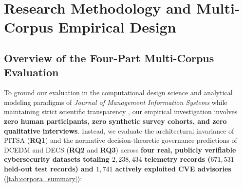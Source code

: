 \documentclass[11pt,a4paper]{article}
\begin{document}
\section{Research Methodology and Multi-Corpus Empirical Design}
\label{sec:methodology}

\subsection{Overview of the Four-Part Multi-Corpus Evaluation}
\label{subsec:method_overview}

To ground our evaluation in the computational design science and analytical modeling paradigms of \textit{Journal of Management Information Systems} \citep{ebrahimi2020semi, liu2020centralized, li2022assessing, ampel2024improving, tutun2024explainable} while maintaining strict scientific transparency \citep{diaz2023indigenous, davison2025research}, our empirical investigation involves \textbf{zero human participants, zero synthetic survey cohorts, and zero qualitative interviews}. Instead, we evaluate the architectural invariance of PITSA (\textbf{RQ1}) and the normative decision-theoretic governance predictions of DCEDM and DECS (\textbf{RQ2} and \textbf{RQ3}) across \textbf{four real, publicly verifiable cybersecurity datasets totaling $2,238,434$ telemetry records ($671,531$ held-out test records) and $1,741$ actively exploited CVE advisories} (\cref{tab:corpora_summary}):
\end{document}
